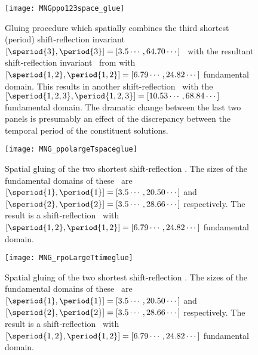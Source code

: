\begin{description}
{\begin{figure}
\begin{minipage}[height=.4\textheight]{.99\textwidth}
\centering
\texttt{[image: MNGppo123space\_glue]}
\end{minipage}
\caption{ \label{fig:ppo123spaceglue}
Gluing procedure which spatially combines the third shortest (period) shift-reflection
invariant
$[\speriod{3},\period{3}]=[3.5\cdots,64.70\cdots]$
\twot\
 with the resultant shift-reflection invariant \twot\
from
with
$[\speriod{1,2},\period{1,2}]=[6.79\cdots,24.82\cdots]$
fundamental domain.
This results in another shift-reflection
\twot\ with the
$[\speriod{1,2,3},\period{1,2,3}]=[10.53\cdots,68.84\cdots]$
 fundamental domain.
The dramatic change between the last
two panels is presumably an effect of the
discrepancy between the temporal period of
the constituent solutions.
}
\end{figure}


\begin{figure}
\centering
\begin{minipage}[height=.4\textheight]{.66\textwidth}
\centering
\texttt{[image: MNG\_ppolargeTspaceglue]}
\end{minipage}
\caption{ \label{fig:MNGppo12spaceglue1}
Spatial gluing of the two shortest shift-reflection
\twots. The sizes of the fundamental domains of these
\twots\ are
$[\speriod{1},\period{1}]=[3.5\cdots,20.50\cdots]$
and
$[\speriod{2},\period{2}]=[3.5\cdots,28.66\cdots]$
respectively.
The result is a
shift-reflection \twot\ with
$[\speriod{1,2},\period{1,2}]=[6.79\cdots,24.82\cdots]$
fundamental domain.
}
\end{figure}


\begin{figure}
\centering
\begin{minipage}[height=.4\textheight]{.66\textwidth}
\centering
\texttt{[image: MNG\_rpoLargeTtimeglue]}
\end{minipage}
\caption{ \label{fig:MNGppo12spaceglue2}
Spatial gluing of the two shortest shift-reflection
\twots. The sizes of the fundamental domains of these
\twots\ are
$[\speriod{1},\period{1}]=[3.5\cdots,20.50\cdots]$
and
$[\speriod{2},\period{2}]=[3.5\cdots,28.66\cdots]$
respectively.
The result is a
shift-reflection \twot\ with
$[\speriod{1,2},\period{1,2}]=[6.79\cdots,24.82\cdots]$
fundamental domain.
}
\end{figure}


}
\end{description}
